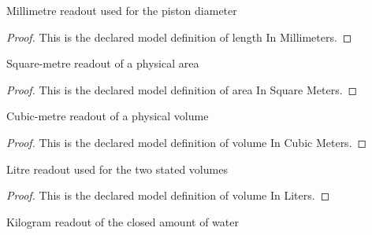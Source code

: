 \begin{definition}
  \label{def:physics:phyx-mini-0446:phyxminiproblems-problemphyxmini0446-lengthinmillimeters}
  Millimetre readout used for the piston diameter
\end{definition}
\begin{proof}
  This is the declared model definition of length In Millimeters.
\end{proof}
\begin{definition}
  \label{def:physics:phyx-mini-0446:phyxminiproblems-problemphyxmini0446-areainsquaremeters}
  Square-metre readout of a physical area
\end{definition}
\begin{proof}
  This is the declared model definition of area In Square Meters.
\end{proof}
\begin{definition}
  \label{def:physics:phyx-mini-0446:phyxminiproblems-problemphyxmini0446-volumeincubicmeters}
  Cubic-metre readout of a physical volume
\end{definition}
\begin{proof}
  This is the declared model definition of volume In Cubic Meters.
\end{proof}
\begin{definition}
  \label{def:physics:phyx-mini-0446:phyxminiproblems-problemphyxmini0446-volumeinliters}
  Litre readout used for the two stated volumes
\end{definition}
\begin{proof}
  This is the declared model definition of volume In Liters.
\end{proof}
\begin{definition}
  \label{def:physics:phyx-mini-0446:phyxminiproblems-problemphyxmini0446-massinkilograms}
  Kilogram readout of the closed amount of water
\end{definition}

